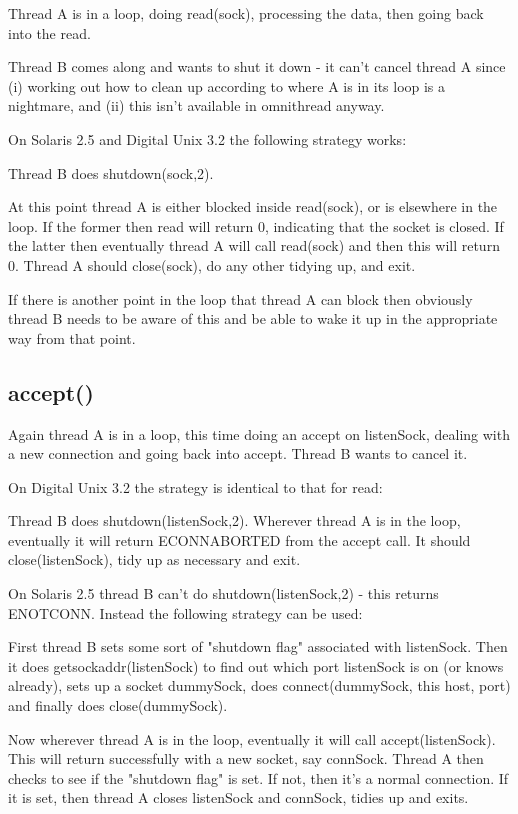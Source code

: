 \documentclass[11pt]{article}
\begin{document}
Thread A is in a loop, doing read(sock), processing the data, then going back
into the read.

Thread B comes along and wants to shut it down - it can't cancel thread A since
(i) working out how to clean up according to where A is in its loop is a
nightmare, and (ii) this isn't available in omnithread anyway.

On Solaris 2.5 and Digital Unix 3.2 the following strategy works:

Thread B does shutdown(sock,2).

At this point thread A is either blocked inside read(sock), or is elsewhere in
the loop.  If the former then read will return 0, indicating that the socket is
closed.  If the latter then eventually thread A will call read(sock) and then
this will return 0.  Thread A should close(sock), do any other tidying up, and
exit.

If there is another point in the loop that thread A can block then obviously
thread B needs to be aware of this and be able to wake it up in the appropriate
way from that point.



\subsection{accept()}

Again thread A is in a loop, this time doing an accept on listenSock, dealing
with a new connection and going back into accept.  Thread B wants to cancel it.

On Digital Unix 3.2 the strategy is identical to that for read:

Thread B does shutdown(listenSock,2).  Wherever thread A is in the loop,
eventually it will return ECONNABORTED from the accept call.  It should
close(listenSock), tidy up as necessary and exit.

On Solaris 2.5 thread B can't do shutdown(listenSock,2) - this returns
ENOTCONN.  Instead the following strategy can be used:

First thread B sets some sort of "shutdown flag" associated with listenSock.
Then it does getsockaddr(listenSock) to find out which port listenSock is on
(or knows already), sets up a socket dummySock, does connect(dummySock, this
host, port) and finally does close(dummySock).

Now wherever thread A is in the loop, eventually it will call
accept(listenSock).  This will return successfully with a new socket, say
connSock.  Thread A then checks to see if the "shutdown flag" is set.  If not,
then it's a normal connection.  If it is set, then thread A closes listenSock
and connSock, tidies up and exits.
\end{document}
